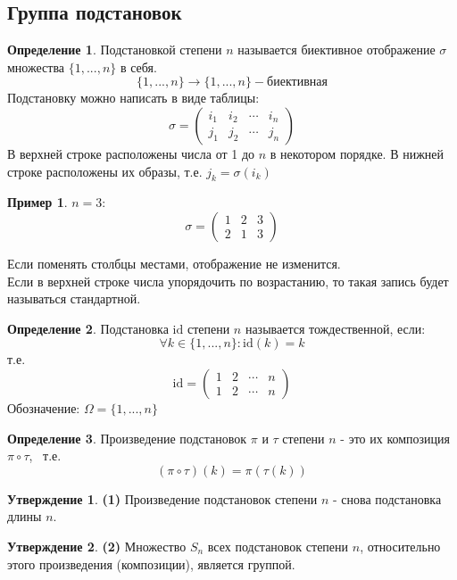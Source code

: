 \documentclass[a4paper, 12pt]{article}
\theoremstyle{definition}
\newtheorem*{definition}{Определение}
\newtheorem*{subtheorem}{Утверждение}
\newtheorem*{example1}{Пример}
\begin{document}
  \subsection{Группа подстановок}
  \begin{definition}
    Подстановкой степени $n$ называется биективное отображение $\sigma$ множества $\{1,...,n\}$ в себя. 
    $$\{1,...,n\} \to \{1,...,n\} - \text{биективная}$$  
    Подстановку можно написать в виде таблицы:
    $$\sigma = \begin{pmatrix}
      i_1 & i_2 & \cdots & i_n \\
      j_1 & j_2 & \cdots & j_n
    \end{pmatrix}$$ 
    В верхней строке расположены числа от 1 до $n$ в некотором порядке. В нижней строке расположены их образы, т.е. $j_k = \sigma(i_k)$ 
    \begin{example1}
      $n=3:$ $$\sigma=\begin{pmatrix}
        1 & 2 & 3 \\
        2 & 1 & 3
      \end{pmatrix}$$  
    \end{example1}
    Если поменять столбцы местами, отображение не изменится. \\
    Если в верхней строке числа упорядочить по возрастанию, то такая запись будет называться стандартной.
  \end{definition} 
  \begin{definition}
    Подстановка $\textrm{id}$ степени $n$ называется тождественной, если:
    $$\forall k \in \{1,...,n\}: \textrm{id}(k) = k$$ 
    т.е. $$\textrm{id} = \begin{pmatrix}
      1 & 2 & \cdots & n \\
      1 & 2 & \cdots & n
    \end{pmatrix}$$  
    Обозначение: $\Omega = \{1,...,n\}$ 
  \end{definition} 
  \begin{definition}
    Произведение подстановок $\pi$ и $\tau$ степени $n$ - это их композиция $\pi \circ \tau$, \ т.е. $$(\pi \circ \tau)(k)= \pi(\tau(k))$$  
  \end{definition} 
  \begin{subtheorem}\textbf{(1)} 
    Произведение подстановок степени $n$ - снова подстановка длины $n$. 
  \end{subtheorem} 
  \begin{subtheorem}\textbf{(2)}
    Множество $S_n$ всех подстановок степени $n$, относительно этого произведения (композиции), является группой. 
  \end{subtheorem} 
\end{document}
